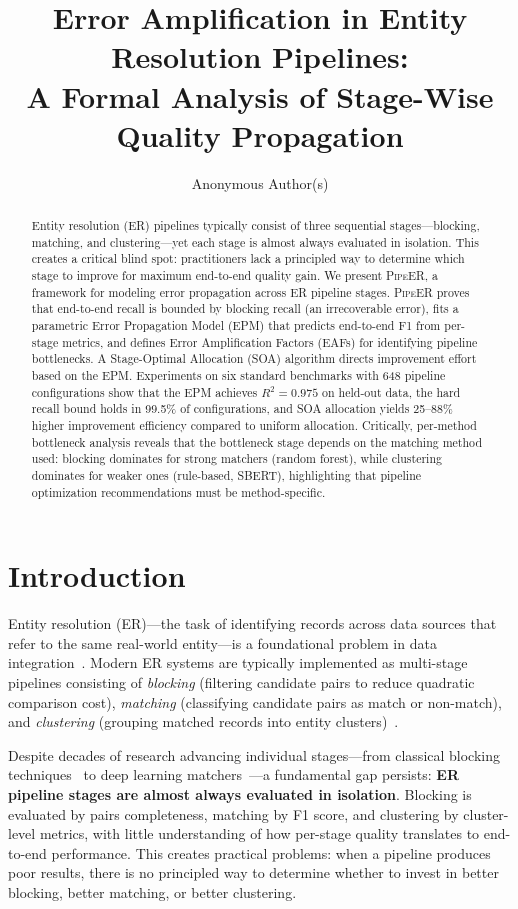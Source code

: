 \documentclass{article}
\title{Error Amplification in Entity Resolution Pipelines:\\A Formal Analysis of Stage-Wise Quality Propagation}
\author{
  Anonymous Author(s)
}
\newcommand{\PipeER}{\textsc{PipeER}}
\begin{document}
\maketitle

\begin{abstract}
Entity resolution (ER) pipelines typically consist of three sequential stages---blocking, matching, and clustering---yet each stage is almost always evaluated in isolation.
This creates a critical blind spot: practitioners lack a principled way to determine which stage to improve for maximum end-to-end quality gain.
We present \PipeER{}, a framework for modeling error propagation across ER pipeline stages.
\PipeER{} proves that end-to-end recall is bounded by blocking recall (an irrecoverable error), fits a parametric Error Propagation Model (EPM) that predicts end-to-end F1 from per-stage metrics, and defines Error Amplification Factors (EAFs) for identifying pipeline bottlenecks.
A Stage-Optimal Allocation (SOA) algorithm directs improvement effort based on the EPM.
Experiments on six standard benchmarks with 648 pipeline configurations show that the EPM achieves $R^2 = 0.975$ on held-out data, the hard recall bound holds in 99.5\% of configurations, and SOA allocation yields 25--88\% higher improvement efficiency compared to uniform allocation.
Critically, per-method bottleneck analysis reveals that the bottleneck stage depends on the matching method used: blocking dominates for strong matchers (random forest), while clustering dominates for weaker ones (rule-based, SBERT), highlighting that pipeline optimization recommendations must be method-specific.
\end{abstract}

\section{Introduction}

Entity resolution (ER)---the task of identifying records across data sources that refer to the same real-world entity---is a foundational problem in data integration~\citep{fellegi1969theory,christen2012data}.
Modern ER systems are typically implemented as multi-stage pipelines consisting of \emph{blocking} (filtering candidate pairs to reduce quadratic comparison cost), \emph{matching} (classifying candidate pairs as match or non-match), and \emph{clustering} (grouping matched records into entity clusters)~\citep{christophides2020overview}.

Despite decades of research advancing individual stages---from classical blocking techniques~\citep{papadakis2020blocking} to deep learning matchers~\citep{mudgal2018deep,li2020deep}---a fundamental gap persists: \textbf{ER pipeline stages are almost always evaluated in isolation}.
Blocking is evaluated by pairs completeness, matching by F1 score, and clustering by cluster-level metrics, with little understanding of how per-stage quality translates to end-to-end performance.
This creates practical problems: when a pipeline produces poor results, there is no principled way to determine whether to invest in better blocking, better matching, or better clustering.
\end{document}
